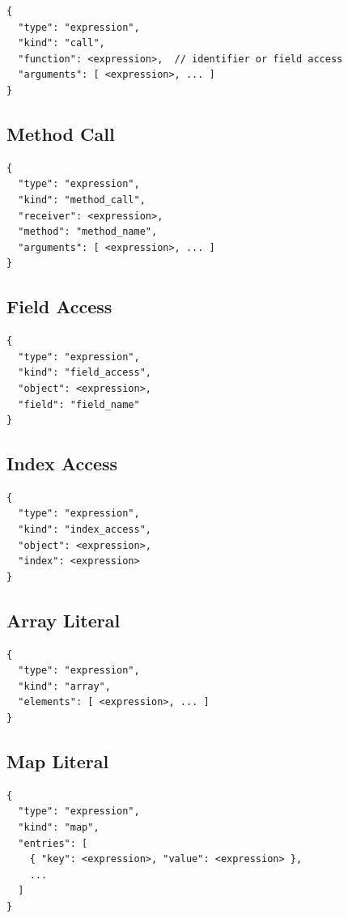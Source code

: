 \begin{lstlisting}[language={}]
{
  "type": "expression",
  "kind": "call",
  "function": <expression>,  // identifier or field access
  "arguments": [ <expression>, ... ]
}
\end{lstlisting}

\subsection{Method Call}

\begin{lstlisting}[language={}]
{
  "type": "expression",
  "kind": "method_call",
  "receiver": <expression>,
  "method": "method_name",
  "arguments": [ <expression>, ... ]
}
\end{lstlisting}

\subsection{Field Access}

\begin{lstlisting}[language={}]
{
  "type": "expression",
  "kind": "field_access",
  "object": <expression>,
  "field": "field_name"
}
\end{lstlisting}

\subsection{Index Access}

\begin{lstlisting}[language={}]
{
  "type": "expression",
  "kind": "index_access",
  "object": <expression>,
  "index": <expression>
}
\end{lstlisting}

\subsection{Array Literal}

\begin{lstlisting}[language={}]
{
  "type": "expression",
  "kind": "array",
  "elements": [ <expression>, ... ]
}
\end{lstlisting}

\subsection{Map Literal}

\begin{lstlisting}[language={}]
{
  "type": "expression",
  "kind": "map",
  "entries": [
    { "key": <expression>, "value": <expression> },
    ...
  ]
}
\end{lstlisting}

